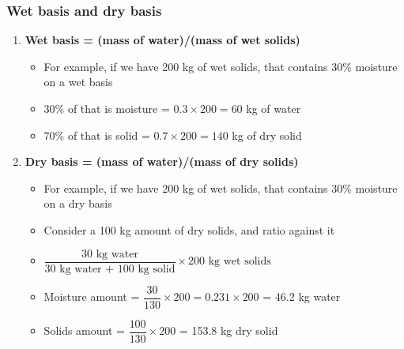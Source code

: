 \begin{frame}\frametitle{Wet basis and dry basis}
	\begin{enumerate}
		\item	{\color{myOrange}\textbf{Wet basis = (mass of water)/(mass of wet solids)}}
		\begin{itemize}
			\item	For example, if we have 200 kg of wet solids, that contains 30\% moisture on a wet basis
			\item	30\% of that is moisture = $0.3 \times 200 = 60$ kg of water
			\item	70\% of that is solid = $0.7 \times 200 = 140$ kg of dry solid
		\end{itemize}

		\vspace{12pt}
		\item	{\color{myOrange}\textbf{Dry basis = (mass of water)/(mass of dry solids)}}
		\begin{itemize}
			\item	For example, if we have 200 kg of wet solids, that contains 30\% moisture on a dry basis
			\item	Consider a 100 kg amount of dry solids, and ratio against it

			\item	$\dfrac{\text{30 kg water}}{\text{30 kg water + 100 kg solid}} \times \text{200 kg wet solids}$
			\item	Moisture amount = $\dfrac{30}{130} \times 200 = 0.231 \times 200$ = 46.2 kg water
			\item	Solids amount = $\dfrac{100}{130} \times 200$ = 153.8 kg dry solid
		\end{itemize}
		
		
	\end{enumerate}
\end{frame}

